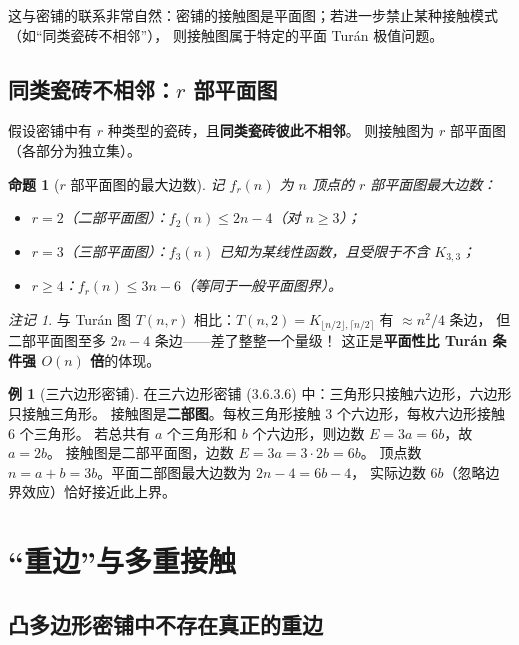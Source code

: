 \documentclass[12pt,a4paper]{article}
\theoremstyle{plain}
\newtheorem{proposition}[theorem]{命题}
\theoremstyle{definition}
\newtheorem{example}[theorem]{例}
\theoremstyle{remark}
\newtheorem{remark}[theorem]{注记}
\begin{document}
这与密铺的联系非常自然：密铺的接触图是平面图；若进一步禁止某种接触模式（如``同类瓷砖不相邻''），
则接触图属于特定的平面 Tur\'an 极值问题。

\subsection{同类瓷砖不相邻：$r$ 部平面图}

假设密铺中有 $r$ 种类型的瓷砖，且\textbf{同类瓷砖彼此不相邻}。
则接触图为 $r$ 部平面图（各部分为独立集）。

\begin{proposition}[$r$ 部平面图的最大边数]
记 $f_r(n)$ 为 $n$ 顶点的 $r$ 部平面图最大边数：
\begin{itemize}
    \item $r=2$（二部平面图）：$f_2(n) \le 2n-4$（对 $n \ge 3$）；
    \item $r=3$（三部平面图）：$f_3(n)$ 已知为某线性函数，且受限于不含 $K_{3,3}$；
    \item $r \ge 4$：$f_r(n) \le 3n-6$（等同于一般平面图界）。
\end{itemize}
\end{proposition}

\begin{remark}
与 Tur\'an 图 $T(n,r)$ 相比：$T(n,2) = K_{\lfloor n/2\rfloor, \lceil n/2\rceil}$ 有 $\approx n^2/4$ 条边，
但二部平面图至多 $2n-4$ 条边——差了整整一个量级！
这正是\textbf{平面性比 Tur\'an 条件强 $O(n)$ 倍}的体现。
\end{remark}

\begin{example}[三六边形密铺]
在三六边形密铺 (3.6.3.6) 中：三角形只接触六边形，六边形只接触三角形。
接触图是\textbf{二部图}。每枚三角形接触 $3$ 个六边形，每枚六边形接触 $6$ 个三角形。
若总共有 $a$ 个三角形和 $b$ 个六边形，则边数 $E = 3a = 6b$，故 $a = 2b$。
接触图是二部平面图，边数 $E = 3a = 3 \cdot 2b = 6b$。
顶点数 $n = a + b = 3b$。平面二部图最大边数为 $2n-4 = 6b-4$，
实际边数 $6b$（忽略边界效应）恰好接近此上界。
\end{example}

\section{``重边''与多重接触}\label{sec:multi-edge}

\subsection{凸多边形密铺中不存在真正的重边}
\end{document}
